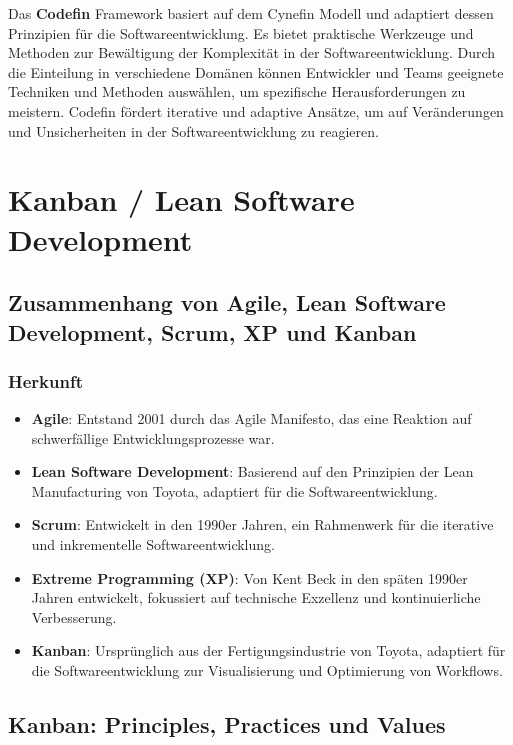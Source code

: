Das \textbf{Codefin} Framework basiert auf dem Cynefin Modell und adaptiert dessen Prinzipien für die Softwareentwicklung. Es bietet praktische Werkzeuge und Methoden zur Bewältigung der Komplexität in der Softwareentwicklung. Durch die Einteilung in verschiedene Domänen können Entwickler und Teams geeignete Techniken und Methoden auswählen, um spezifische Herausforderungen zu meistern. Codefin fördert iterative und adaptive Ansätze, um auf Veränderungen und Unsicherheiten in der Softwareentwicklung zu reagieren.

\section{Kanban / Lean Software Development}

\subsection{Zusammenhang von Agile, Lean Software Development, Scrum, XP und Kanban}

\subsubsection{Herkunft}

\begin{itemize}
    \item \textbf{Agile}: Entstand 2001 durch das Agile Manifesto, das eine Reaktion auf schwerfällige Entwicklungsprozesse war.
    \item \textbf{Lean Software Development}: Basierend auf den Prinzipien der Lean Manufacturing von Toyota, adaptiert für die Softwareentwicklung.
    \item \textbf{Scrum}: Entwickelt in den 1990er Jahren, ein Rahmenwerk für die iterative und inkrementelle Softwareentwicklung.
    \item \textbf{Extreme Programming (XP)}: Von Kent Beck in den späten 1990er Jahren entwickelt, fokussiert auf technische Exzellenz und kontinuierliche Verbesserung.
    \item \textbf{Kanban}: Ursprünglich aus der Fertigungsindustrie von Toyota, adaptiert für die Softwareentwicklung zur Visualisierung und Optimierung von Workflows.
\end{itemize}

\subsection{Kanban: Principles, Practices und Values}

